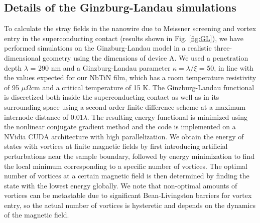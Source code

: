 \subsection{Details of the Ginzburg-Landau simulations}
To calculate the stray fields in the nanowire due to Meissner screening and vortex entry in the superconducting contact (results shown in Fig. \ref{fig:GL}), we have performed simulations on the Ginzburg-Landau model \cite{Gropp1996} in a realistic three-dimensional geometry using the dimensions of device A. We used a penetration depth $\lambda$ = 290 nm and a Ginzburg-Landau parameter $\kappa = \lambda / \xi$ = 50, in line with the values expected for our NbTiN film, which has a room temperature resistivity of 95 $\mu \Omega$cm and a critical temperature of 15 K. The Ginzburg-Landau functional is discretized both inside the superconducting contact as well as in its surrounding space \cite{Du1999} using a second-order finite difference scheme at a maximum internode distance of 0.01$\lambda$. The resulting energy functional is minimized using the nonlinear conjugate gradient method and the code is implemented on a NVidia CUDA architecture with high parallelization.
We obtain the energy of states with vortices at finite magnetic fields by first introducing artificial perturbations near the sample boundary, followed by energy minimization to find the local minimum corresponding to a specific number of vortices. The optimal number of vortices at a certain magnetic field is then determined by finding the state with the lowest energy globally. We note that non-optimal amounts of vortices can be metastable due to significant Bean-Livingston barriers for vortex entry, so the actual number of vortices is hysteretic and depends on the dynamics of the magnetic field.

